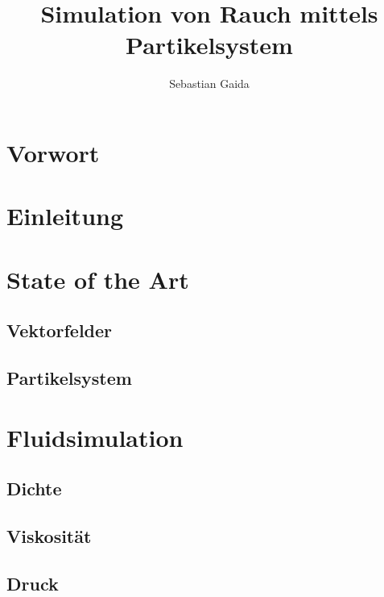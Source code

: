 \documentclass[intern,palatino]{cgBA}
\author{Sebastian Gaida}
\title{Simulation von Rauch mittels Partikelsystem}
\begin{document}
	\maketitle
	\newpage
	\tableofcontents
	\clearpage         %
	


\section{Vorwort}


\section{Einleitung}


\section{State of the Art}
\subsection{Vektorfelder}
\subsection{Partikelsystem}


\section{Fluidsimulation}
\subsection{Dichte}
\subsection{Viskosität}
\subsection{Druck}
\end{document}

